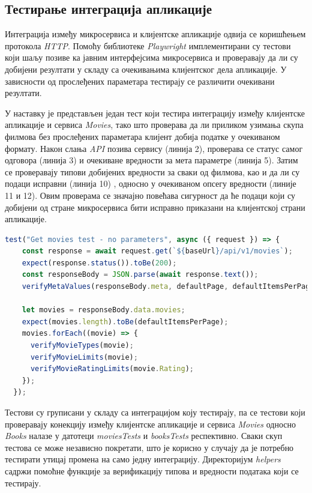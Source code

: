 \documentclass[12pt,oneside]{memoir}
\begin{document}
\subsection{Тестирање интеграција апликације}

Интеграција између микросервиса и клијентске апликације одвија се коришћењем протокола \textit{HTTP}. Помоћу библиотеке \textit{Playwright} имплементирани су тестови који шаљу позиве ка јавним интерфејсима микросервиса и проверавају да ли су добијени резултати у складу са очекивањима клијентског дела апликације. У зависности од прослеђених параметара тестирају се различити очекивани резултати.

У наставку је представљен један тест који тестира интеграцију између клијентске апликације и сервиса \textit{Movies}, тако што проверава да ли приликом узимања скупа филмова без прослеђених параметара клијент добија податке у очекиваном формату. Након слања \textit{API} позива сервису (линија 2), проверава се статус самог одговора (линија 3) и очекиване вредности за мета параметре (линија 5). Затим се проверавају типови добијених вредности за сваки од филмова, као и да ли су подаци исправни  (линија 10) , односно у очекиваном опсегу вредности (линије 11 и 12). Овим проверама се значајно повећава сигурност да ће подаци који су добијени од стране микросервиса бити исправно приказани на клијентској страни апликације.



\begin{lstlisting}[caption= Тест интеграције сервиса \textit{Movies} и клијентске апликације, 
language=Javascript,
label={lst:integrationTest},
frame=single]
test("Get movies test - no parameters", async ({ request }) => {
    const response = await request.get(`${baseUrl}/api/v1/movies`);
    expect(response.status()).toBe(200);
    const responseBody = JSON.parse(await response.text());
    verifyMetaValues(responseBody.meta, defaultPage, defaultItemsPerPage);

    let movies = responseBody.data.movies;
    expect(movies.length).toBe(defaultItemsPerPage);
    movies.forEach((movie) => {
      verifyMovieTypes(movie);
      verifyMovieLimits(movie);
      verifyMovieRatingLimits(movie.Rating);
    });
  });
\end{lstlisting}

Тестови су груписани у складу са интеграцијом коју тестирају, па се тестови који проверавају конекцију између клијентске апликације и сервиса \textit{Movies} односно \textit{Books} налазе у датотеци \textit{moviesTests} и \textit{booksTests} респективно. Сваки скуп тестова се може независно покретати, што је корисно у случају да је потребно тестирати утицај промена на само једну интеграцију. Директоријум \textit{helpers} садржи помоћне функције за верификацију типова и вредности података који се тестирају.
\end{document}
